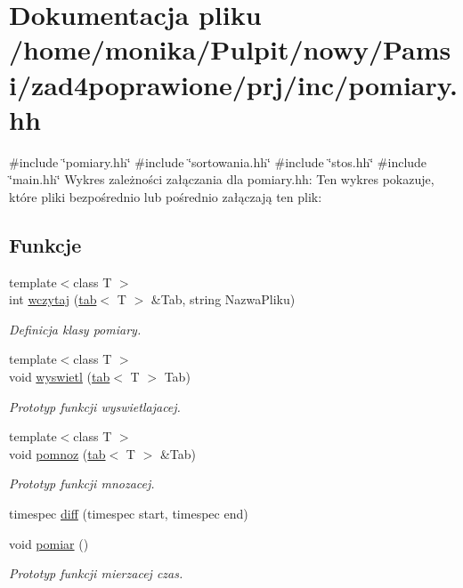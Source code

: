 \hypertarget{pomiary_8hh}{\section{\-Dokumentacja pliku /home/monika/\-Pulpit/nowy/\-Pamsi/zad4poprawione/prj/inc/pomiary.hh}
\label{pomiary_8hh}
}
{\ttfamily \#include \char`\"{}pomiary.\-hh\char`\"{}}\*
{\ttfamily \#include \char`\"{}sortowania.\-hh\char`\"{}}\*
{\ttfamily \#include \char`\"{}stos.\-hh\char`\"{}}\*
{\ttfamily \#include \char`\"{}main.\-hh\char`\"{}}\*
\-Wykres zależności załączania dla pomiary.\-hh\-:
\-Ten wykres pokazuje, które pliki bezpośrednio lub pośrednio załączają ten plik\-:
\subsection*{\-Funkcje}
\begin{DoxyCompactItemize}
\item 
{\footnotesize template$<$class T $>$ }\\int \hyperlink{pomiary_8hh_a8dd09d2ae11639b0591b5f678f63b438}{wczytaj} (\hyperlink{classtab}{tab}$<$ \-T $>$ \&\-Tab, string \-Nazwa\-Pliku)
\begin{DoxyCompactList}\small\item\em \-Definicja klasy pomiary. \end{DoxyCompactList}\item 
{\footnotesize template$<$class T $>$ }\\void \hyperlink{pomiary_8hh_a84d0295bc97cad9a4f456b25ade31197}{wyswietl} (\hyperlink{classtab}{tab}$<$ \-T $>$ \-Tab)
\begin{DoxyCompactList}\small\item\em \-Prototyp funkcji wyswietlajacej. \end{DoxyCompactList}\item 
{\footnotesize template$<$class T $>$ }\\void \hyperlink{pomiary_8hh_a7eab400b30e2aa2000a05254aba04f0f}{pomnoz} (\hyperlink{classtab}{tab}$<$ \-T $>$ \&\-Tab)
\begin{DoxyCompactList}\small\item\em \-Prototyp funkcji mnozacej. \end{DoxyCompactList}\item 
timespec \hyperlink{pomiary_8hh_a5959b2e100c03e81bd1c5049adf30165}{diff} (timespec start, timespec end)
\item 
void \hyperlink{pomiary_8hh_a41466d87f95931be3de0eccdda4a563f}{pomiar} ()
\begin{DoxyCompactList}\small\item\em \-Prototyp funkcji mierzacej czas. \end{DoxyCompactList}\end{DoxyCompactItemize}


